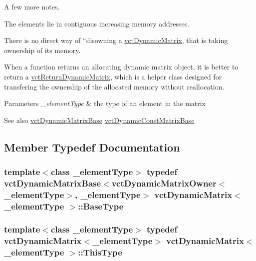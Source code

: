 A few more notes. 
\begin{DoxyItemize}
\item The elements lie in contiguous increasing memory addresses. 
\item There is no direct way of ``disowning\textquotesingle{}\textquotesingle{} a \hyperlink{classvct_dynamic_matrix}{vct\+Dynamic\+Matrix}, that is taking ownership of its memory. 
\item When a function returns an allocating dynamic matrix object, it is better to return a \hyperlink{classvct_return_dynamic_matrix}{vct\+Return\+Dynamic\+Matrix}, which is a helper class designed for transfering the ownership of the allocated memory without reallocation. 
\end{DoxyItemize}


\begin{DoxyParams}{Parameters}
{\em \+\_\+element\+Type} & the type of an element in the matrix\\
\hline
\end{DoxyParams}
\begin{DoxySeeAlso}{See also}
\hyperlink{classvct_dynamic_matrix_base}{vct\+Dynamic\+Matrix\+Base} \hyperlink{classvct_dynamic_const_matrix_base}{vct\+Dynamic\+Const\+Matrix\+Base} 
\end{DoxySeeAlso}


\subsection{Member Typedef Documentation}
\hypertarget{classvct_dynamic_matrix_a80b366a0b1c03c7a5453e76aea1fbe83}{}
\subsubsection[{Base\+Type}]{\setlength{\rightskip}{0pt plus 5cm}template$<$class \+\_\+element\+Type$>$ typedef {\bf vct\+Dynamic\+Matrix\+Base}$<${\bf vct\+Dynamic\+Matrix\+Owner}$<$\+\_\+element\+Type$>$, \+\_\+element\+Type$>$ {\bf vct\+Dynamic\+Matrix}$<$ \+\_\+element\+Type $>$\+::{\bf Base\+Type}}\label{classvct_dynamic_matrix_a80b366a0b1c03c7a5453e76aea1fbe83}
\hypertarget{classvct_dynamic_matrix_a49440a1600af9e5cbce01b74a66434bd}{}
\subsubsection[{This\+Type}]{\setlength{\rightskip}{0pt plus 5cm}template$<$class \+\_\+element\+Type$>$ typedef {\bf vct\+Dynamic\+Matrix}$<$\+\_\+element\+Type$>$ {\bf vct\+Dynamic\+Matrix}$<$ \+\_\+element\+Type $>$\+::{\bf This\+Type}}\label{classvct_dynamic_matrix_a49440a1600af9e5cbce01b74a66434bd}



